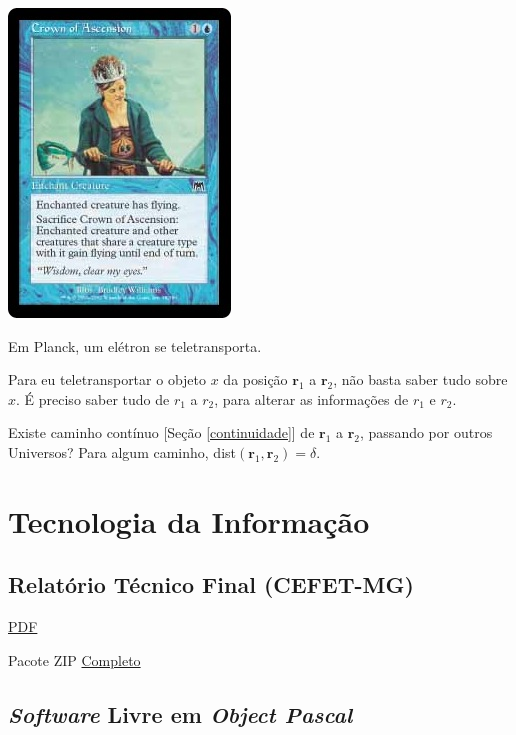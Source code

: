 \documentclass[12pt,a4paper]{article}
\begin{document}
\begin{center}
			\includegraphics{ascension}
		\end{center}

		Em Planck\cite{planck}, um el\'etron se teletransporta.

		Para eu teletransportar o objeto $x$ da posi\c{c}\~ao $\mathbf{r}_1$ a $\mathbf{r}_2$, n\~ao basta saber tudo sobre $x$. \'E preciso saber tudo de $r_1$ a $r_2$, para alterar as informa\c{c}\~oes de $r_1$ e $r_2$.

		Existe caminho cont\'inuo [Se\c{c}\~ao \ref{continuidade}] de $\mathbf{r}_1$ a $\mathbf{r}_2$, passando por outros Universos? Para algum caminho, dist$(\mathbf{r}_1, \mathbf{r}_2) = \delta $.

	\section{Tecnologia da Informa\c{c}\~ao}
			\begin{flushright}
			\end{flushright}

		\subsection{Relat\'orio T\'ecnico Final (CEFET-MG)}
			\begin{flushright}
			\end{flushright}

			\href{https://github.com/boralaemcasa/propagation/tree/master/webs%20dot%20com/info/reltec.pdf}{PDF}

			Pacote ZIP \href{https://github.com/boralaemcasa/propagation/tree/master/webs%20dot%20com/info/reltec.zip}{Completo}

		\subsection{\emph{Software} Livre em \emph{Object Pascal}}
			\begin{flushright}
			\end{flushright}
\end{document}
